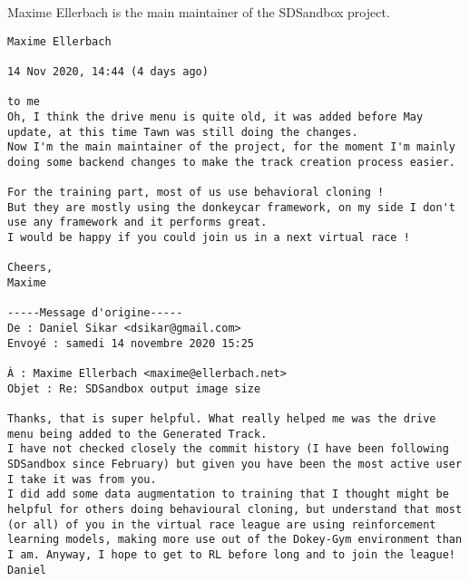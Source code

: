 Maxime Ellerbach is the main maintainer of the SDSandbox project. 

\begin{verbatim}
Maxime Ellerbach
	
14 Nov 2020, 14:44 (4 days ago)
	
to me
Oh, I think the drive menu is quite old, it was added before May update, at this time Tawn was still doing the changes.
Now I'm the main maintainer of the project, for the moment I'm mainly doing some backend changes to make the track creation process easier.

For the training part, most of us use behavioral cloning !
But they are mostly using the donkeycar framework, on my side I don't use any framework and it performs great.
I would be happy if you could join us in a next virtual race !

Cheers,
Maxime

-----Message d'origine-----
De : Daniel Sikar <dsikar@gmail.com>
Envoyé : samedi 14 novembre 2020 15:25

À : Maxime Ellerbach <maxime@ellerbach.net>
Objet : Re: SDSandbox output image size

Thanks, that is super helpful. What really helped me was the drive menu being added to the Generated Track.
I have not checked closely the commit history (I have been following SDSandbox since February) but given you have been the most active user I take it was from you.
I did add some data augmentation to training that I thought might be helpful for others doing behavioural cloning, but understand that most (or all) of you in the virtual race league are using reinforcement learning models, making more use out of the Dokey-Gym environment than I am. Anyway, I hope to get to RL before long and to join the league!
Daniel

\end{verbatim}